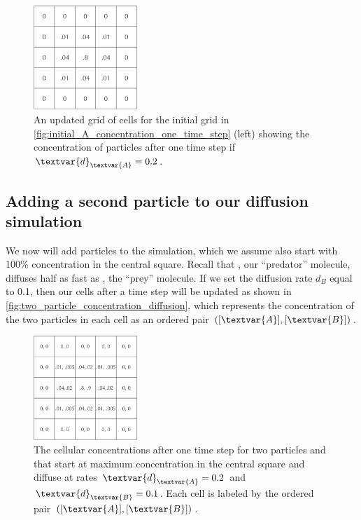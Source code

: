 \begin{figure}[h]
\centering
\mySfFamily
\includegraphics[width = 0.35\textwidth]{../images/A_concentration_slower_diffusion.png}
\caption{An updated grid of cells for the initial grid in \autoref{fig:initial_A_concentration_one_time_step} (left) showing the concentration of  particles after one time step if $\textvar{d}_\textvar{A} = \text{0.2}$.}
\label{fig:A_concentration_slower_diffusion}
\end{figure}

\FloatBarrier
{}
\subsection{Adding a second particle to our diffusion simulation}

We now will add  particles to the simulation, which we assume also start with 100\% concentration in the central square. Recall that , our ``predator'' molecule, diffuses half as fast as , the ``prey'' molecule. If we set the diffusion rate $d_B$ equal to 0.1, then our cells after a time step will be updated as shown in \autoref{fig:two_particle_concentration_diffusion}, which represents the concentration of the two particles in each cell as an ordered pair $([\textvar{A}], [\textvar{B}])$.\\

\begin{figure}[h]
\centering
\mySfFamily
\includegraphics[width = 0.35\textwidth]{../images/two_particle_concentration_diffusion.png}
\caption{The cellular concentrations after one time step for two particles  and  that start at maximum concentration in the central square and diffuse at rates $\textvar{d}_\textvar{A} = \text{0.2}$ and $\textvar{d}_\textvar{B} = \text{0.1}$. Each cell is labeled by the ordered pair $([\textvar{A}], [\textvar{B}])$.}
\label{fig:two_particle_concentration_diffusion}
\end{figure}

